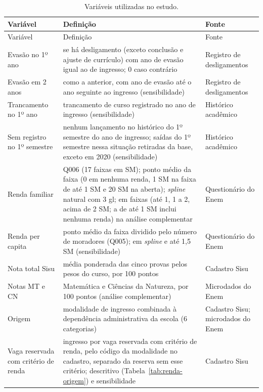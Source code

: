 \documentclass[12pt,a4paper]{article}
\begin{document}
\begin{small}
\begin{longtable}{@{}>{\raggedright\arraybackslash}p{3.2cm}>{\raggedright\arraybackslash}p{8.0cm}>{\raggedright\arraybackslash}p{3.4cm}@{}}
  \caption[Variáveis utilizadas no estudo]{Variáveis utilizadas no estudo.}
  \label{tab:variaveis}\\
  \toprule
  Variável & Definição & Fonte \\
  \midrule
  \endfirsthead
  \toprule
  Variável & Definição & Fonte \\
  \midrule
  \endhead
  \bottomrule
  \endlastfoot
  Evasão no 1º ano & 1 se há desligamento (exceto conclusão e ajuste de currículo) com ano de evasão igual ao de ingresso; 0 caso contrário & Registro de desligamentos \\
  Evasão em 2 anos & como a anterior, com ano de evasão até o ano seguinte ao ingresso (sensibilidade) & Registro de desligamentos \\
  Trancamento no 1º ano & trancamento de curso registrado no ano de ingresso (sensibilidade) & Histórico acadêmico \\
  Sem registro no 1º semestre & nenhum lançamento no histórico do 1º semestre do ano de ingresso; saídas do 1º semestre nessa situação retiradas da base, exceto em 2020 (sensibilidade) & Histórico acadêmico \\
  Renda familiar & Q006 (17 faixas em SM); ponto médio da faixa (0 em nenhuma renda, 1 SM na faixa de até 1 SM e 20 SM na aberta); \textit{spline} natural com 3 gl; em faixas (até 1, 1 a 2, acima de 2 SM; a de até 1 SM inclui nenhuma renda) na análise complementar & Questionário do Enem \\
  Renda per capita & ponto médio da faixa dividido pelo número de moradores (Q005); em \textit{spline} e até 1,5 SM (sensibilidade) & Questionário do Enem \\
  Nota total Sisu & média ponderada das cinco provas pelos pesos do curso, por 100 pontos & Cadastro Sisu \\
  Notas MT e CN & Matemática e Ciências da Natureza, por 100 pontos (análise complementar) & Microdados do Enem \\
  Origem & modalidade de ingresso combinada à dependência administrativa da escola (6 categorias) & Cadastro Sisu; microdados do Enem \\
  Vaga reservada com critério de renda & ingresso por vaga reservada com critério de renda, pelo código da modalidade no cadastro, separado da reserva sem esse critério; descritivo (Tabela~\ref{tab:renda-origem}) e sensibilidade & Cadastro Sisu \\

\end{longtable}
\end{small}
\end{document}
